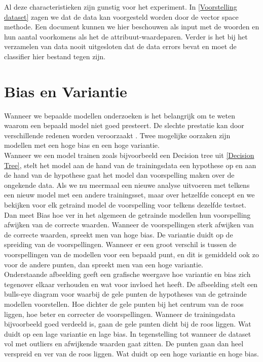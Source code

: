 Al deze characteristieken zijn gunstig voor het experiment. In \ref{Voorstelling dataset} zagen we dat de data kan voorgesteld worden door de vector space methode. Een document kunnen we hier beschouwen als input met de woorden en hun aantal voorkomens als het de attribuut-waardeparen. Verder is het bij het verzamelen van data nooit uitgesloten dat de data errors bevat en moet de classifier hier bestand tegen zijn.

\section{Bias en Variantie}\label{Bias en Variantie}

Wanneer we bepaalde modellen onderzoeken is het belangrijk om te weten waarom een bepaald model niet goed presteert. De slechte prestatie kan door verschillende redenen worden veroorzaakt \cite{mitchell1997machine}. Twee mogelijke oorzaken zijn modellen met een hoge bias en een hoge variantie.\\
%
%
Wanneer we een model trainen zoals bijvoorbeeld een Decision tree uit \ref{Decision Tree}, stelt het model aan de hand van de trainingsdata een hypothese op en aan de hand van de hypothese gaat het model dan voorspelling maken over de ongekende data. Als we nu meermaal een nieuwe analyse uitvoeren met telkens een nieuw model met een andere trainingsset, maar over hetzelfde concept en we bekijken voor elk getraind model de voorspelling voor telkens dezelfde testset. Dan meet Bias hoe ver in het algemeen de getrainde modellen hun voorspelling afwijken van de correcte waarden. Wanneer de voorspellingen sterk afwijken van de correcte waarden, spreekt men van hoge bias.  De variantie duidt op de spreiding van de voorspellingen. Wanneer er een groot verschil is tussen de voorspellingen van de modellen voor een bepaald punt, en dit is gemiddeld ook zo voor de andere punten, dan spreekt men van een hoge variantie.\\
%
Onderstaande afbeelding geeft een grafische weergave hoe variantie en bias zich tegenover elkaar verhouden en wat voor invloed het heeft.
De afbeelding stelt een bulls-eye diagram voor waarbij de gele punten de hypotheses van de getrainde modellen voorstellen. Hoe dichter de gele punten bij het centrum van de roos liggen, hoe beter en correcter de voorspellingen. Wanneer de trainingsdata bijvoorbeeld goed verdeeld is, gaan de gele punten dicht bij de roos liggen. Wat duidt op een lage variantie en lage bias. In tegenstelling tot wanneer de dataset vol met outliers en afwijkende waarden gaat zitten. De punten gaan dan heel verspreid en ver van de roos liggen. Wat duidt op een hoge variantie en hoge bias.\\
